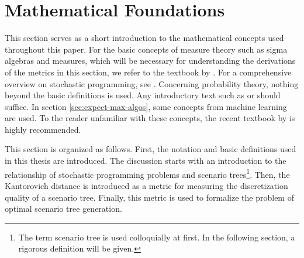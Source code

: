 \section{Mathematical Foundations}
\label{sec:math-foundations}
This section serves as a short introduction to the mathematical concepts used throughout this paper.
For the basic concepts of measure theory such as sigma algebras and measures, which will be necessary for understanding the derivations of the metrics in this section, we refer to the textbook by .
For a comprehensive overview on stochastic programming, see .
Concerning probability theory, nothing beyond the basic definitions is used.
Any introductory text such as  or  should suffice.
In section \ref{sec:expect-max-algos}, some concepts from machine learning are used.
To the reader unfamiliar with these concepts, the recent textbook by  is highly recommended.

This section is organized as follows.
First, the notation and basic definitions used in this thesis are introduced.
The discussion starts with an introduction to the relationship of stochastic programming problems and scenario trees\footnote{The term scenario tree is used colloquially at first. In the following section, a rigorous definition will be given.}.
Then, the Kantorovich distance is introduced as a metric for measuring the discretization quality of a scenario tree.
Finally, this metric is used to formalize the problem of optimal scenario tree generation.
